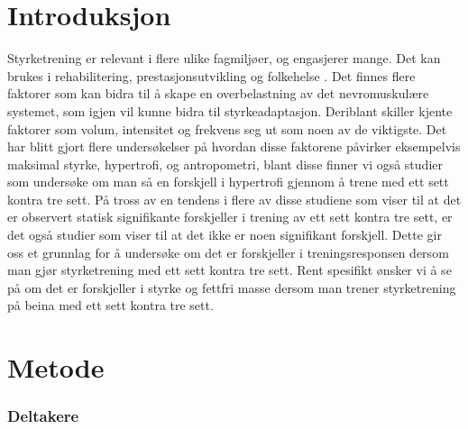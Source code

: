 \documentclass[
]{book}
\begin{document}
\hypertarget{introduksjon-1}{%
\section{Introduksjon}\label{introduksjon-1}}

Styrketrening er relevant i flere ulike fagmiljøer, og engasjerer mange. Det kan brukes i rehabilitering, prestasjonsutvikling og folkehelse \citep[\citet{cirer-sastre2017},\citet{lovell2016},\citet{suetta2007}]{hickey2020}. Det finnes flere faktorer som kan bidra til å skape en overbelastning av det nevromuskulære systemet, som igjen vil kunne bidra til styrkeadaptasjon\citep[\citet{marshall2011}]{rhea2002}. Deriblant skiller kjente faktorer som volum, intensitet og frekvens seg ut som noen av de viktigste. Det har blitt gjort flere undersøkelser på hvordan disse faktorene påvirker eksempelvis maksimal styrke, hypertrofi, og antropometri, blant disse finner vi også studier som undersøke om man så en forskjell i hypertrofi gjennom å trene med ett sett kontra tre sett\citetext{\citealp[\citet{rhea2002}]{schoenfeld2019}; \citealp{munn2005}; \citealp[\citet{carpinelli1998}]{fröhlich2010}}. På tross av en tendens i flere av disse studiene som viser til at det er observert statisk signifikante forskjeller i trening av ett sett kontra tre sett, er det også studier som viser til at det ikke er noen signifikant forskjell. Dette gir oss et grunnlag for å undersøke om det er forskjeller i treningsresponsen dersom man gjør styrketrening med ett sett kontra tre sett. Rent spesifikt ønsker vi å se på om det er forskjeller i styrke og fettfri masse dersom man trener styrketrening på beina med ett sett kontra tre sett.

\hypertarget{metode-2}{%
\section{Metode}\label{metode-2}}

\hypertarget{deltakere}{%
\subsubsection{Deltakere}\label{deltakere}}
\end{document}
